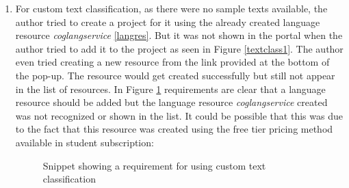 \begin{enumerate}
    \item \label{item:tcfeature} For custom text classification, as there were no sample texts available, the author tried to create a project for it using the already created language resource \textit{coglangservice} \ref{langres}. But it was not shown in the portal when the author tried to add it to the project as seen in Figure \ref{textclass1}. The author even tried creating a new resource from the link provided at the bottom of the pop-up. The resource would get created successfully but still not appear in the list of resources. In Figure \ref{textclass2} requirements are clear that a language resource should be added but the language resource \textit{coglangservice} created was not recognized or shown in the list. It could be possible that this was due to the fact that this resource was created using the free tier pricing method available in student subscription:
        \begin {figure}[h!h]
            \centering
            \caption{Snippet showing a requirement for using custom text classification}
            \label{textclass2}
        \end {figure}
        \begin {figure}[h!h]
            \centering

\end{figure}
\end{enumerate}
